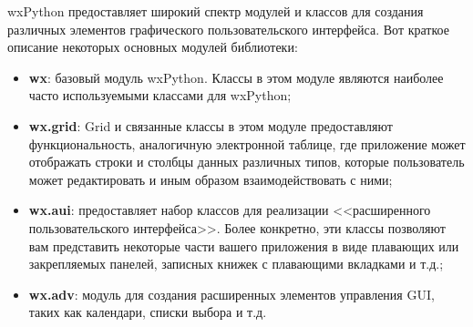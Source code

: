 wxPython предоставляет широкий спектр модулей и классов для создания различных элементов графического пользовательского интерфейса. Вот краткое описание некоторых основных модулей библиотеки:
\begin{itemize}
\item \textbf{wx}: базовый модуль wxPython. Классы в этом модуле являются наиболее часто используемыми классами для wxPython;
\item \textbf{wx.grid}: Grid и связанные классы в этом модуле предоставляют функциональность, аналогичную электронной таблице, где приложение может отображать строки и столбцы данных различных типов, которые пользователь может редактировать и иным образом взаимодействовать с ними;
\item \textbf{wx.aui}: предоставляет набор классов для реализации <<расширенного пользовательского интерфейса>>. Более конкретно, эти классы позволяют вам представить некоторые части вашего приложения в виде плавающих или закрепляемых панелей, записных книжек с плавающими вкладками и т.д.;
\item \textbf{wx.adv}: модуль для создания расширенных элементов управления GUI, таких как календари, списки выбора и т.д.
\end{itemize}